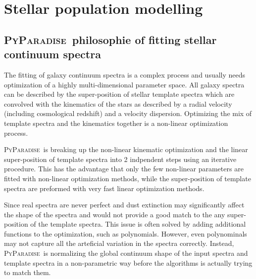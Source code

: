 \documentclass[usenatbib,usegraphicx,useAMS,onecolumn]{mn2e}
\newcommand{\codeline}[1]{\lstinline|#1|}
\newcommand{\paramdef}[1]{\textcolor{red}{\codeline{#1}}}
\newcommand{\fname}[1]{\textcolor{magenta}{\codeline{#1}}}
\newcommand{\PyPar}{\mbox{\textsc{PyParadise}}}
\begin{document}

\section{Stellar population modelling}\label{sec:ssp_model}
\subsection{\PyPar\ philosophie of fitting stellar continuum spectra}\label{subsec:ssp_algo}
The fitting of galaxy continuum spectra is a complex process and usually needs optimization of a highly multi-dimensional parameter space. All galaxy spectra can be described by the super-position of stellar template spectra which are convolved with the kinematics of the stars as described by a radial velocity (including cosmological redshift) and a velocity dispersion. Optimizing the mix of template spectra and the kinematics together is a non-linear optimization process.

\PyPar\ is breaking up the non-linear kinematic optimization and the linear super-position of template spectra into 2 indpendent steps using an iterative procedure. This has the advantage that only the few non-linear parameters are fitted with non-linear optimization methods, while the super-position of template spectra are preformed with very fast linear optimization methods. 

Since real spectra are never perfect and dust extinction may significantly affect the shape of the spectra and would not provide a good match to the any super-position of the template spectra. This issue is often solved by adding additional functions to the optimization, such as polynomials. However, even polynominals may not capture all the arteficial variation in the spectra correctly. Instead, \PyPar\ is normalizing the global continuum shape of the input spectra and template spectra in a non-parametric way before the algorithms is actually trying to match them.
\end{document}
